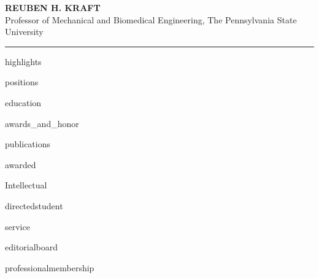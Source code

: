 \documentclass[a4paper,10pt]{article}
\author{}
\date{}
\begin{document}
\thispagestyle{firstpage}

\begin{center}
\LARGE \textbf{\textsc{REUBEN H. KRAFT}} \\
\normalsize Professor of Mechanical and Biomedical Engineering, The Pennsylvania State University \\
\rule{\linewidth}{2pt}
\end{center}
\normalsize

{{highlights}}

\newpage

{{positions}}

{{education}}

{{awards_and_honor}}

{{publications}}

{{awarded}}

{{Intellectual}}

{{directedstudent}}

{{service}}

{{editorialboard}}

{{professionalmembership}}
\end{document}
